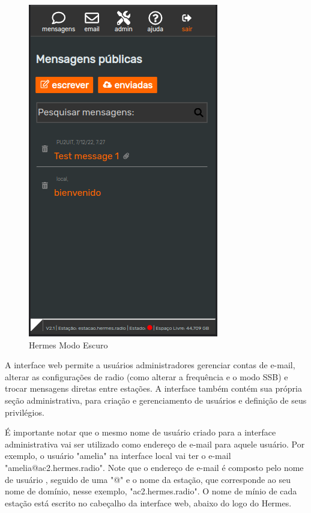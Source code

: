 \documentclass[11pt,a4paper]{article}
\begin{document}
\begin{figure}[H]
    \centering
    \includegraphics[width=0.5\columnwidth]{screenshots/frontend/pt_kn/darkmode.png}
    \caption{Hermes Modo Escuro}
    \label{fig:darkmode}
    \end{figure}

A interface web permite a usuários administradores gerenciar contas de e-mail, alterar as configurações de radio (como alterar a frequência e o modo SSB) e trocar mensagens diretas entre estações. A interface também contém sua própria seção administrativa, para criação e gerenciamento de usuários e definição de seus privilégios.     

É importante notar que o mesmo nome de usuário criado para a interface administrativa vai ser utilizado como endereço de e-mail para aquele usuário. Por exemplo, o usuário "amelia" na interface local vai ter o e-mail "amelia@ac2.hermes.radio". Note que o endereço de e-mail é composto pelo nome de usuário , seguido de uma "@" e o nome da estação, que corresponde ao seu nome de domínio, nesse exemplo, "ac2.hermes.radio". O nome de mínio de cada estação está escrito no cabeçalho da interface web, abaixo do logo do Hermes. 
\end{document}
